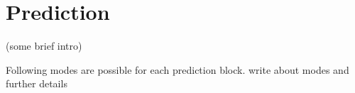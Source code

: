 
\chapter{Prediction} %
\label{Chapter3}

(some brief intro)

Following modes are possible for each prediction block. write about modes and further details